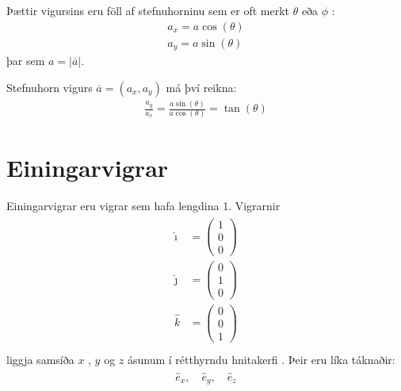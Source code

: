 \documentclass[a4paper,10pt,icelandic]{sphinxmanual}
\begin{document}
Þættir vigursins eru föll af stefnuhorninu sem er oft merkt \(\theta\) eða \(\phi\) :
\begin{equation*}
\begin{split}a_x = a\cos(\theta) \\
a_y = a\sin(\theta)\end{split}
\end{equation*}
þar sem \(a=|\overline{a}|\).

Stefnuhorn vigurs \(\overline{a} = (a_x,a_y)\) má því reikna:
\begin{equation*}
\begin{split}\frac{a_y}{a_x} = \frac{a\sin(\theta)}{a\cos(\theta)} = \tan(\theta)\end{split}
\end{equation*}
\begin{figure}[htbp]
\centering

\noindent{}
\end{figure}


\section{Einingarvigrar}
\label{\detokenize{Kafli08:einingarvigrar}}
Einingarvigrar eru vigrar sem hafa lengdina 1.
Vigrarnir
\begin{equation*}
\begin{split}\begin{aligned}
\hat{\imath} &= \begin{pmatrix} 1 \\0 \\0 \end{pmatrix} \\
\hat{\jmath} &= \begin{pmatrix} 0 \\1 \\0 \end{pmatrix} \\
\hat{k} &= \begin{pmatrix} 0\\0 \\1 \end{pmatrix} \\
\end{aligned}\end{split}
\end{equation*}
liggja samsíða \(x\) \sphinxhyphen{} , \(y\) \sphinxhyphen{} og  \(z\) \sphinxhyphen{}  ásunum í rétthyrndu hnitakerfi .
Þeir eru líka táknaðir:
\begin{equation*}
\begin{split}\begin{gather}
\hat{e}_x, \quad \hat{e}_y, \quad \hat{e}_z
\end{gather}\end{split}
\end{equation*}
\begin{figure}[htbp]
\centering

\noindent{}
\end{figure}
\end{document}
